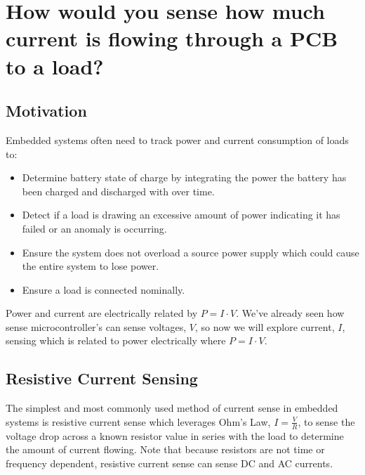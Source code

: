 \documentclass[main.tex]{subfiles}
\begin{document}
\section{How would you sense how much current is flowing through a PCB to a load?}


\spoilerline

\subsection{Motivation}
Embedded systems often need to track power and current consumption of loads to:
\begin{itemize}
    \item Determine battery state of charge by integrating the power the battery has been charged and discharged with over time.
    \item Detect if a load is drawing an excessive amount of power indicating it has failed or an anomaly is occurring. 
    \item Ensure the system does not overload a source power supply which could cause the entire system to lose power. 
    \item Ensure a load is connected nominally.
\end{itemize}
Power and current are electrically related by $P = I \cdot V$. We've already seen how sense microcontroller's can sense voltages, $V$, so now we will explore current, $I$, sensing which is related to power electrically where $P = I \cdot V$.

\subsection{Resistive Current Sensing}
The simplest and most commonly used method of current sense in embedded systems is resistive current sense which leverages Ohm's Law, $I = \frac{V}{R}$, to sense the voltage drop across a known resistor value in series with the load to determine the amount of current flowing. Note that because resistors are not time or frequency dependent, resistive current sense can sense DC and AC currents. 

\end{document}
